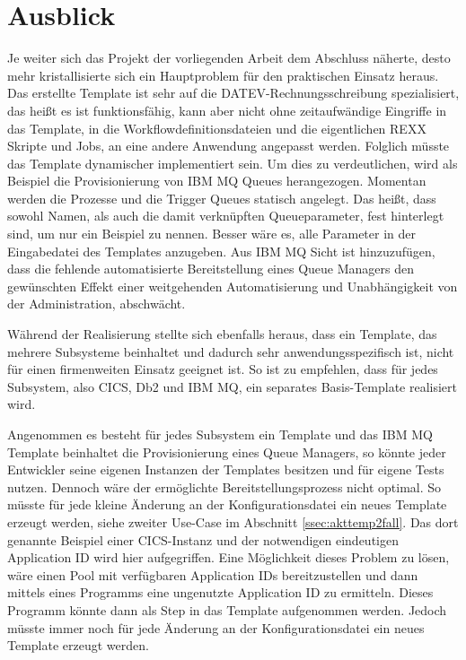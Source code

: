 \chapter{Ausblick}\label{ch:ausblick}
Je weiter sich das Projekt der vorliegenden Arbeit dem Abschluss näherte, desto mehr kristallisierte sich ein Hauptproblem für den praktischen Einsatz heraus.
Das erstellte Template ist sehr auf die DATEV-Rechnungsschreibung spezialisiert, das heißt es ist funktionsfähig, kann aber nicht ohne zeitaufwändige Eingriffe in das Template, in die Workflowdefinitionsdateien und die eigentlichen REXX Skripte und Jobs, an eine andere Anwendung angepasst werden. 
Folglich müsste das Template dynamischer implementiert sein.
Um dies zu verdeutlichen, wird als Beispiel die Provisionierung von IBM MQ Queues herangezogen.
Momentan werden die Prozesse und die Trigger Queues statisch angelegt.
Das heißt, dass sowohl Namen, als auch die damit verknüpften Queueparameter, fest hinterlegt sind, um nur ein Beispiel zu nennen.
Besser wäre es, alle Parameter in der Eingabedatei des Templates anzugeben.
Aus IBM MQ Sicht ist hinzuzufügen, dass die fehlende automatisierte Bereitstellung eines Queue Managers den gewünschten Effekt einer weitgehenden Automatisierung und Unabhängigkeit von der Administration, abschwächt.

Während der Realisierung stellte sich ebenfalls heraus, dass ein Template, das mehrere Subsysteme beinhaltet und dadurch sehr anwendungsspezifisch ist, nicht für einen firmenweiten Einsatz geeignet ist.
So ist zu empfehlen, dass für jedes Subsystem, also CICS, Db2 und IBM MQ, ein separates \glqq Basis\grqq-Template realisiert wird.

Angenommen es besteht für jedes Subsystem ein Template und das IBM MQ Template beinhaltet die Provisionierung eines Queue Managers, so könnte jeder Entwickler seine eigenen Instanzen der Templates besitzen und für eigene Tests nutzen.
Dennoch wäre der ermöglichte Bereitstellungsprozess nicht optimal.
So müsste für jede kleine Änderung an der Konfigurationsdatei ein neues Template erzeugt werden, siehe zweiter Use-Case im Abschnitt \ref{ssec:akttemp2fall}.
Das dort genannte Beispiel einer CICS-Instanz und der notwendigen eindeutigen Application ID wird hier aufgegriffen.
Eine Möglichkeit dieses Problem zu lösen, wäre einen Pool mit verfügbaren Application IDs bereitzustellen und dann mittels eines Programms eine ungenutzte Application ID zu ermitteln.
Dieses Programm könnte dann als Step in das Template aufgenommen werden.
Jedoch müsste immer noch für jede Änderung an der Konfigurationsdatei ein neues Template erzeugt werden.


